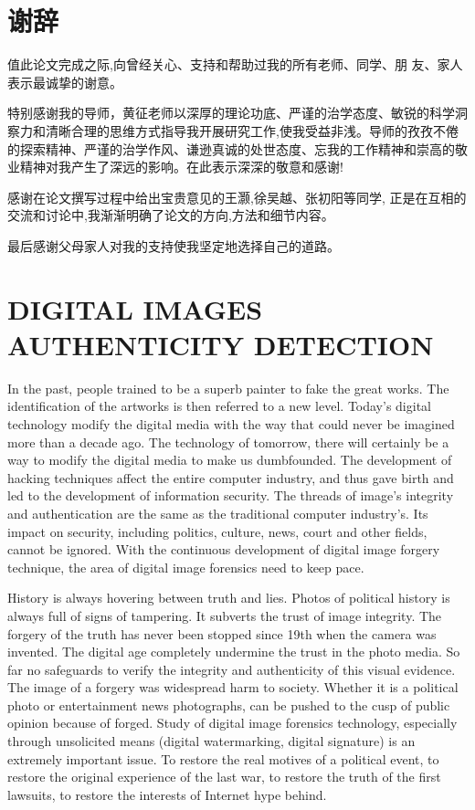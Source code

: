 \documentclass[a4paper, 10pt, notitlepage]{report}
\newcommand{\liuhao}{\fontsize{8pt}{\baselineskip}\selectfont}
\begin{document}
\chapter*{\sffamily\mdseries 谢辞}
    值此论文完成之际,向曾经关心、支持和帮助过我的所有老师、同学、朋 友、家人表示最诚挚的谢意。

	特别感谢我的导师，黄征老师以深厚的理论功底、严谨的治学态度、敏锐的科学洞察力和清晰合理的思维方式指导我开展研究工作,使我受益非浅。导师的孜孜不倦的探索精神、严谨的治学作风、谦逊真诚的处世态度、忘我的工作精神和崇高的敬业精神对我产生了深远的影响。在此表示深深的敬意和感谢!

    感谢在论文撰写过程中给出宝贵意见的王灏,徐吴越、张初阳等同学, 正是在互相的交流和讨论中,我渐渐明确了论文的方向,方法和细节内容。

    最后感谢父母家人对我的支持使我坚定地选择自己的道路。


\label{lstpage}
\newpage
\chapter*{DIGITAL IMAGES AUTHENTICITY DETECTION}
	\setcounter{page}{1}
	\fancypagestyle{plain}{
		\cfoot{\liuhao 第\,\thepage\,页~~共\,\pageref{lstpage2}\,页}
	}
	\cfoot{\liuhao 第\,\thepage\,页~~共\,\pageref{lstpage2}\,页}
	In the past, people trained to be a superb painter to fake the great works. The identification of the artworks is then referred to a new level. Today's digital technology modify the digital media with the way that could never be imagined more than a decade ago. The technology of tomorrow, there will certainly be a way to modify the digital media to make us dumbfounded. The development of hacking techniques affect the entire computer industry, and thus gave birth and led to the development of information security. The threads of image's integrity and authentication are the same as the traditional computer industry's. Its impact on security, including politics, culture, news, court and other fields, cannot be ignored. With the continuous development of digital image forgery technique, the area of digital image forensics need to keep pace. 

	History is always hovering between truth and lies. Photos of political history is always full of signs of tampering. It subverts the trust of image integrity. The forgery of the truth has never been stopped since 19th when the camera was invented. The digital age completely undermine the trust in the photo media. So far no safeguards to verify the integrity and authenticity of this visual evidence. The image of a forgery was widespread harm to society. Whether it is a political photo or entertainment news photographs, can be pushed to the cusp of public opinion because of forged. Study of digital image forensics technology, especially through unsolicited means (digital watermarking, digital signature) is an extremely important issue. To restore the real motives of a political event, to restore the original experience of the last war, to restore the truth of the first lawsuits, to restore the interests of Internet hype behind. 
\end{document}
